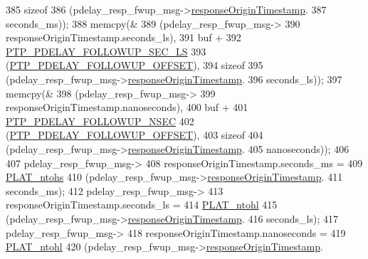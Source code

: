 \begin{DoxyCode}
{{{{{{{{385                    \textcolor{keyword}{sizeof}
386                    (pdelay\_resp\_fwup\_msg->\hyperlink{class_p_t_p_message_path_delay_resp_follow_up_ace95ddb3f03eb3b4fcf8f73281dc0ee3}{responseOriginTimestamp}.
387                 seconds\_ms));
388             memcpy(&
389                    (pdelay\_resp\_fwup\_msg->
390                 responseOriginTimestamp.seconds\_ls),
391                    buf +
392                    \hyperlink{avbts__message_8hpp_a9a1f675eb7706c235c9d3bb050683da2}{PTP\_PDELAY\_FOLLOWUP\_SEC\_LS}
393                    (\hyperlink{avbts__message_8hpp_af0f41aa83b1011ea5b8c42abddd8cd50}{PTP\_PDELAY\_FOLLOWUP\_OFFSET}),
394                    \textcolor{keyword}{sizeof}
395                    (pdelay\_resp\_fwup\_msg->\hyperlink{class_p_t_p_message_path_delay_resp_follow_up_ace95ddb3f03eb3b4fcf8f73281dc0ee3}{responseOriginTimestamp}.
396                 seconds\_ls));
397             memcpy(&
398                    (pdelay\_resp\_fwup\_msg->
399                 responseOriginTimestamp.nanoseconds),
400                    buf +
401                    \hyperlink{avbts__message_8hpp_a405e85b9d79337d889c22e4b7959aa84}{PTP\_PDELAY\_FOLLOWUP\_NSEC}
402                    (\hyperlink{avbts__message_8hpp_af0f41aa83b1011ea5b8c42abddd8cd50}{PTP\_PDELAY\_FOLLOWUP\_OFFSET}),
403                    \textcolor{keyword}{sizeof}
404                    (pdelay\_resp\_fwup\_msg->\hyperlink{class_p_t_p_message_path_delay_resp_follow_up_ace95ddb3f03eb3b4fcf8f73281dc0ee3}{responseOriginTimestamp}.
405                 nanoseconds));
406 
407             pdelay\_resp\_fwup\_msg->
408                 responseOriginTimestamp.seconds\_ms =
409                 \hyperlink{linux_2src_2platform_8cpp_a6b8f3e7b87b66fa774a07ddc67f883a7}{PLAT\_ntohs}
410                 (pdelay\_resp\_fwup\_msg->\hyperlink{class_p_t_p_message_path_delay_resp_follow_up_ace95ddb3f03eb3b4fcf8f73281dc0ee3}{responseOriginTimestamp}.
411                  seconds\_ms);
412             pdelay\_resp\_fwup\_msg->
413                 responseOriginTimestamp.seconds\_ls =
414                 \hyperlink{linux_2src_2platform_8cpp_ad335681c3444e0406899693a6f782173}{PLAT\_ntohl}
415                 (pdelay\_resp\_fwup\_msg->\hyperlink{class_p_t_p_message_path_delay_resp_follow_up_ace95ddb3f03eb3b4fcf8f73281dc0ee3}{responseOriginTimestamp}.
416                  seconds\_ls);
417             pdelay\_resp\_fwup\_msg->
418                 responseOriginTimestamp.nanoseconds =
419                 \hyperlink{linux_2src_2platform_8cpp_ad335681c3444e0406899693a6f782173}{PLAT\_ntohl}
420                 (pdelay\_resp\_fwup\_msg->\hyperlink{class_p_t_p_message_path_delay_resp_follow_up_ace95ddb3f03eb3b4fcf8f73281dc0ee3}{responseOriginTimestamp}.
}}}}}}}}
\end{DoxyCode}
